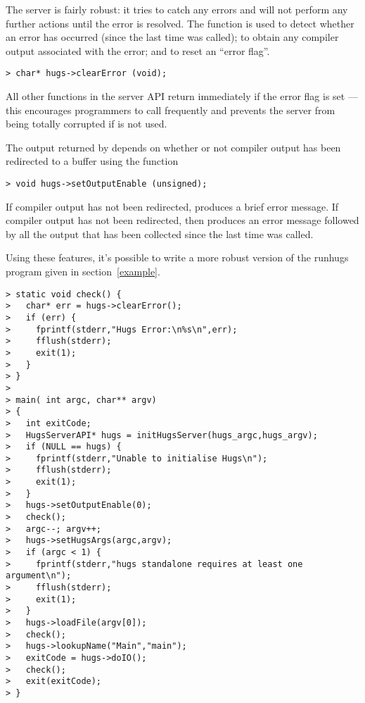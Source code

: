 The \Hugs{} server is fairly robust: it tries to catch any errors and
will not perform any further actions until the error is resolved.
The function  is used to detect whether an error
has occurred (since the last time  was called); to 
obtain any compiler output associated with the error; and to reset 
an ``error flag''.  

\begin{verbatim}
> char* hugs->clearError (void);
\end{verbatim}

All other functions in the server API return immediately if the error
flag is set --- this encourages programmers to call 
frequently and prevents the server from being totally corrupted if
 is not used.

The output returned by  depends on whether or not
compiler output has been redirected to a buffer using the function

\begin{verbatim}
> void hugs->setOutputEnable (unsigned);
\end{verbatim}

If compiler output has not been redirected,  produces
a brief error message.  If compiler output has not been redirected,
then  produces an error message followed by all the
output that has been collected since the last time 
was called.

Using these features, it's possible to write a more robust version of
the runhugs program given in section~\ref{example}.

\begin{verbatim}
> static void check() {
>   char* err = hugs->clearError();
>   if (err) {
>     fprintf(stderr,"Hugs Error:\n%s\n",err);
>     fflush(stderr);
>     exit(1);
>   }
> }
> 
> main( int argc, char** argv) 
> {  
>   int exitCode;
>   HugsServerAPI* hugs = initHugsServer(hugs_argc,hugs_argv);     
>   if (NULL == hugs) {
>     fprintf(stderr,"Unable to initialise Hugs\n");
>     fflush(stderr);
>     exit(1);
>   }
>   hugs->setOutputEnable(0);                                      
>   check();
>   argc--; argv++;                                                
>   hugs->setHugsArgs(argc,argv);                                  
>   if (argc < 1) {
>     fprintf(stderr,"hugs standalone requires at least one argument\n");
>     fflush(stderr);
>     exit(1);
>   }
>   hugs->loadFile(argv[0]);                                       
>   check();
>   hugs->lookupName("Main","main");                               
>   exitCode = hugs->doIO();
>   check();
>   exit(exitCode);
> }    
\end{verbatim}

